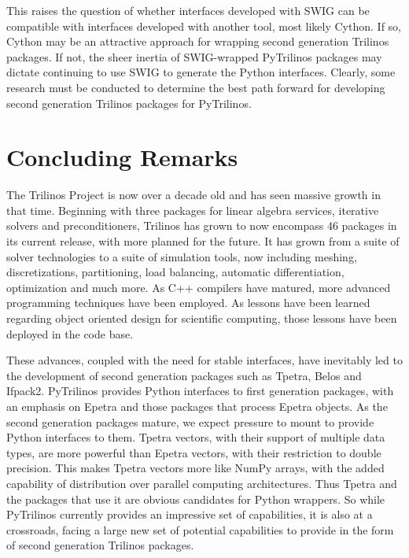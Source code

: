 \documentclass[11pt]{article}
\begin{document}
This raises the question of whether interfaces developed with SWIG can be compatible with interfaces developed with another tool, most likely Cython.  If so, Cython may be an attractive approach for wrapping second generation Trilinos packages.  If not, the sheer inertia of SWIG-wrapped PyTrilinos packages may dictate continuing to use SWIG to generate the Python interfaces.  Clearly, some research must be conducted to determine the best path forward for developing second generation Trilinos packages for PyTrilinos.

\section{Concluding Remarks}
\label{sec:concluding remarks}

The Trilinos Project is now over a decade old and has seen massive growth in that time.  Beginning with three packages for linear algebra services, iterative solvers and preconditioners, Trilinos has grown to now encompass 46 packages in its current release, with more planned for the future.  It has grown from a suite of solver technologies to a suite of simulation tools, now including meshing, discretizations, partitioning, load balancing, automatic differentiation, optimization and much more.  As C++ compilers have matured, more advanced programming techniques have been employed.  As lessons have been learned regarding object oriented design for scientific computing, those lessons have been deployed in the code base.

These advances, coupled with the need for stable interfaces, have inevitably led to the development of second generation packages such as Tpetra, Belos and Ifpack2.  PyTrilinos provides Python interfaces to first generation packages, with an emphasis on Epetra and those packages that process Epetra objects.  As the second generation packages mature, we expect pressure to mount to provide Python interfaces to them.  Tpetra vectors, with their support of multiple data types, are more powerful than Epetra vectors, with their restriction to double precision.  This makes Tpetra vectors more like NumPy arrays, with the added capability of distribution over parallel computing architectures.  Thus Tpetra and the packages that use it are obvious candidates for Python wrappers.  So while PyTrilinos currently provides an impressive set of capabilities, it is also at a crossroads, facing a large new set of potential capabilities to provide in the form of second generation Trilinos packages.



\end{document}

